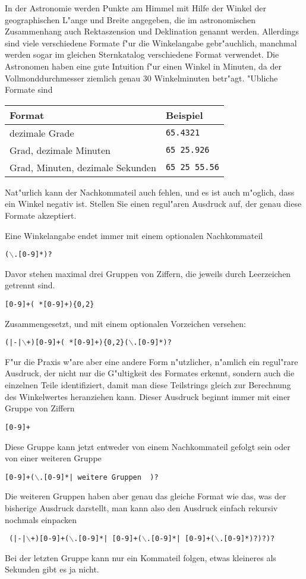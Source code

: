 In der Astronomie werden Punkte am Himmel mit Hilfe der Winkel
der geographischen L"ange und Breite angegeben, die im astronomischen
Zusammenhang auch
Rektaszension und Deklination genannt werden.
Allerdings sind viele verschiedene Formate f"ur die
Winkelangabe gebr"auchlich, manchmal werden sogar im gleichen Sternkatalog
verschiedene Format verwendet.
Die Astronomen haben eine gute Intuition f"ur einen Winkel in Minuten,
da der Vollmonddurchmesser ziemlich genau 30 Winkelminuten betr"agt.
"Ubliche Formate sind
\begin{center}
\begin{tabular}{ll}
Format&Beispiel\\
\hline
dezimale Grade&\texttt{65.4321}\\
Grad, dezimale Minuten&\texttt{65 25.926}\\
Grad, Minuten, dezimale Sekunden&\texttt{65 25 55.56}\\
\hline
\end{tabular}
\end{center}
Nat"urlich kann der Nachkommateil auch fehlen, und es ist auch m"oglich, dass
ein Winkel negativ ist.
Stellen Sie einen regul"aren Ausdruck auf, der genau diese Formate
akzeptiert. 

\begin{loesung}
Eine Winkelangabe endet immer mit einem optionalen Nachkommateil
\begin{center}
\tt($\backslash$.[0-9]*)?
\end{center}
Davor stehen maximal drei Gruppen von Ziffern, die jeweils durch
Leerzeichen getrennt sind.
\begin{center}
\tt[0-9]+( *[0-9]+)\{0,2\}
\end{center}
Zusammengesetzt, und mit einem optionalen Vorzeichen versehen:
\begin{center}
\tt (|-|$\backslash$+)[0-9]+( *[0-9]+)\{0,2\}($\backslash$.[0-9]*)?
\end{center}

F"ur die Praxis w"are aber eine andere Form n"utzlicher, n"amlich ein
regul"rare Ausdruck, der nicht nur die G"ultigkeit des Formates
erkennt, sondern auch die einzelnen Teile identifiziert, damit man
diese Teilstrings gleich zur Berechnung des Winkelwertes heranziehen
kann. Dieser Ausdruck beginnt immer mit einer Gruppe von Ziffern
\begin{center}
\tt [0-9]+
\end{center}
Diese Gruppe kann jetzt entweder von einem Nachkommateil gefolgt sein
oder von einer weiteren Gruppe
\begin{center}
\tt [0-9]+($\backslash$.[0-9]*| {\rm weitere Gruppen } )?
\end{center}
Die weiteren Gruppen haben aber genau das gleiche Format wie das,
was der bisherige Ausdruck darstellt, man kann also den Ausdruck einfach
rekursiv nochmals einpacken
\begin{center}
\tt
(|-|$\backslash$+)[0-9]+($\backslash$.[0-9]*| [0-9]+($\backslash$.[0-9]*| [0-9]+($\backslash$.[0-9]*)?)?)?
\end{center}
Bei der letzten Gruppe kann nur ein Kommateil folgen, etwas kleineres
als Sekunden gibt es ja nicht.
\end{loesung}


